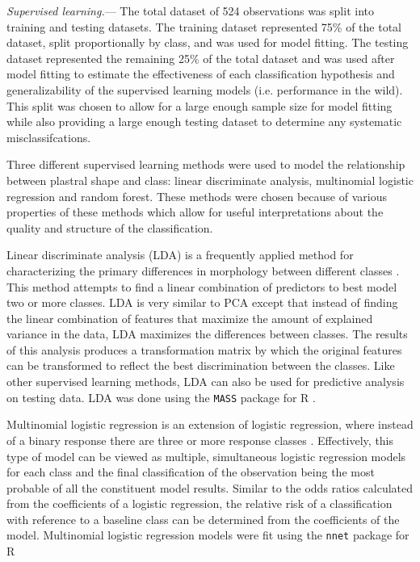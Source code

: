\documentclass[12pt,letterpaper]{article}\usepackage{graphicx, color}
\renewcommand{\subsubsection}[1]{%
\vspace{2ex}
\noindent
\textit{#1.}---}
\begin{document}
\subsubsection{Supervised learning}
The total dataset of 524 observations was split into training and testing datasets. The training dataset represented 75\% of the total dataset, split proportionally by class, and was used for model fitting. The testing dataset represented the remaining 25\% of the total dataset and  was used after model fitting to estimate the effectiveness of each classification hypothesis and generalizability of the supervised learning models (i.e. performance in the wild). This split was chosen to allow for a large enough sample size for model fitting while also providing a large enough testing dataset to determine any systematic misclassifcations.

Three different supervised learning methods were used to model the relationship between plastral shape and class: linear discriminate analysis, multinomial logistic regression and random forest. These methods were chosen because of various properties of these methods which allow for useful interpretations about the quality and structure of the classification.

Linear discriminate analysis (LDA) is a frequently applied method for characterizing the primary differences in morphology between different classes \citep{Zelditch2004,Mitteroecker2011}. This method attempts to find a linear combination of predictors to best model two or more classes. LDA is very similar to PCA except that instead of finding the linear combination of features that maximize the amount of explained variance in the data, LDA maximizes the differences between classes. The results of this analysis produces a transformation matrix by which the original features can be transformed to reflect the best discrimination between the classes. Like other supervised learning methods, LDA can also be used for predictive analysis on testing data. LDA was done using the \texttt{MASS} package for R \citep{Venables2002a}.

Multinomial logistic regression is an extension of logistic regression, where instead of a binary response there are three or more response classes \citep{Venables2002a}. Effectively, this type of model can be viewed as multiple, simultaneous logistic regression models for each class and the final classification of the observation being the most probable of all the constituent model results. Similar to the odds ratios calculated from the coefficients of a logistic regression, the relative risk of a classification with reference to a baseline class can be determined from the coefficients of the model. Multinomial logistic regression models were fit using the \texttt{nnet} package for R \citep{Venables2002a}
\end{document}
